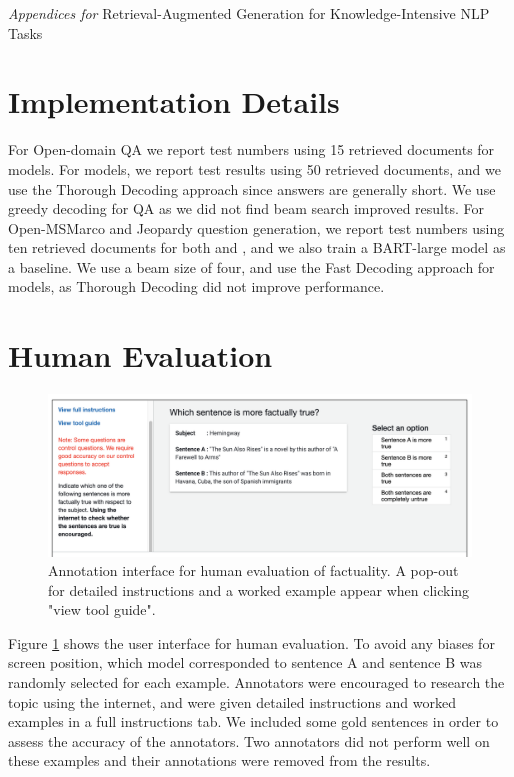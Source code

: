 
\begin{center}
\Large \emph{Appendices for}
{\Large Retrieval-Augmented Generation for Knowledge-Intensive NLP Tasks}\\
\bigskip
\end{center}

\section{Implementation Details}
%
For Open-domain QA we report test numbers using 15 retrieved documents for \ragtoken{} models. For \raganswer{} models, we report test results using 50 retrieved documents, and we use the Thorough Decoding approach since answers are generally short. We use greedy decoding for QA as we did not find beam search improved results. For Open-MSMarco and Jeopardy question generation, we report test numbers using ten retrieved documents for both \ragtoken{} and \raganswer{}, and we also train a BART-large model as a baseline. We use a beam size of four, and use the Fast Decoding approach for \raganswer{} models, as Thorough Decoding did not improve performance.






\section{Human Evaluation}
\begin{figure}[h]
\centering

  \includegraphics[width=\textwidth]{images/annotation_interface.png}
\caption{Annotation interface for human evaluation of factuality. A pop-out for detailed instructions and a worked example appear when clicking "view tool guide".}
  \label{fig:annot}
\end{figure}

Figure \ref{fig:annot} shows the user interface for human evaluation. To avoid any biases for screen position, which model corresponded to sentence A and sentence B was randomly selected for each example. Annotators were encouraged to research the topic using the internet, and were given detailed instructions and worked examples in a full instructions tab. We included some gold sentences in order to assess the accuracy of the annotators. Two annotators did not perform well on these examples and their annotations were removed from the results.

